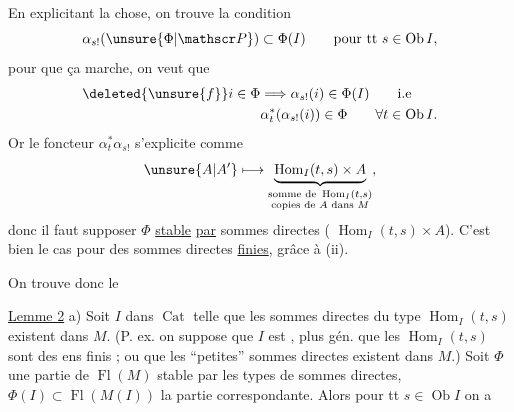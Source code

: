 En explicitant la chose, on trouve la condition
\[
 \alpha_{s!}(\unsure{\Phi|\mathscr P})\subset\Phi(I)\qquad\text{pour tt }s\in\operatorname{Ob} I,
\]
pour que ça marche,  on veut que
\[
\begin{aligned}
 \deleted{\unsure{f}}i\in\Phi&\Longrightarrow\alpha_{s!}(i)\in\Phi(I)\qquad\text{i.e}\\
 &\alpha_{t}^{*}(\alpha_{s!}(i))\in\Phi\qquad\forall t\in\operatorname{Ob}I.
\end{aligned}
\]
Or le foncteur $\alpha_{t}^{*}\alpha_{s!}$ s'explicite comme
\[
 \unsure{A|A'}\longmapsto\underbrace{\operatorname{Hom}_{I}(t,s)\times A}_{\substack{\text{somme de }\operatorname{Hom}_{I}(t,s)\\\text{copies de }A\text{ dans }M}},
\]
donc il faut supposer $\Phi$ \uline{stable} \uline{par} sommes directes ( $\operatorname{Hom}_{I}(t,s)\times A$). C'est bien le cas pour  des sommes directes \uline{finies}, grâce à (ii).

 On trouve donc le

\uline{Lemme 2}\unsure{,} a) Soit $I$ dans $\operatorname{Cat}$ telle que les sommes directes du type $\operatorname{Hom}_{I}(t,s)$ existent dans $M$. (P. ex. on suppose que $I$ est \uline{}, plus gén. que les $\operatorname{Hom}_{I}(t,s)$   sont des ens finis ; ou que les ``petites'' sommes directes existent dans $M$.) Soit $\Phi$ une partie de $\operatorname{Fl}(M)$ stable par les types de sommes directes,   $\Phi(I)\subset\operatorname{Fl}(M(I))$ la partie correspondante. Alors pour tt $s\in\operatorname{Ob} I$ on a
